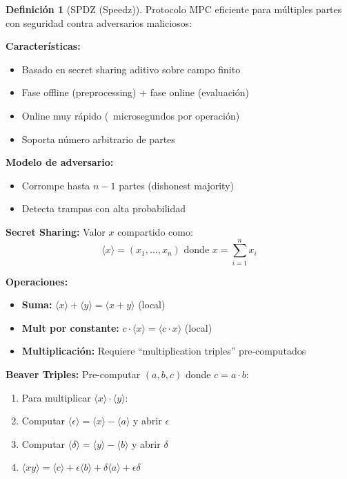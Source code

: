 \documentclass[11pt,a4paper,twoside]{book}
\theoremstyle{definition}
\newtheorem{definition}{Definición}[chapter]
\theoremstyle{remark}
\begin{document}
\begin{definition}[SPDZ (Speedz)]
Protocolo MPC eficiente para múltiples partes con seguridad contra adversarios maliciosos:

\textbf{Características:}
\begin{itemize}
    \item Basado en secret sharing aditivo sobre campo finito
    \item Fase offline (preprocessing) + fase online (evaluación)
    \item Online muy rápido (~microsegundos por operación)
    \item Soporta número arbitrario de partes
\end{itemize}

\textbf{Modelo de adversario:}
\begin{itemize}
    \item Corrompe hasta $n-1$ partes (dishonest majority)
    \item Detecta trampas con alta probabilidad
\end{itemize}
\end{definition}

\begin{mathnote}
\textbf{Secret Sharing:} Valor $x$ compartido como:
\[
\langle x \rangle = (x_1, ..., x_n) \text{ donde } x = \sum_{i=1}^n x_i
\]

\textbf{Operaciones:}
\begin{itemize}
    \item \textbf{Suma:} $\langle x \rangle + \langle y \rangle = \langle x + y \rangle$ (local)
    \item \textbf{Mult por constante:} $c \cdot \langle x \rangle = \langle c \cdot x \rangle$ (local)
    \item \textbf{Multiplicación:} Requiere ``multiplication triples'' pre-computados
\end{itemize}

\textbf{Beaver Triples:} Pre-computar $(a, b, c)$ donde $c = a \cdot b$:
\begin{enumerate}
    \item Para multiplicar $\langle x \rangle \cdot \langle y \rangle$:
    \item Computar $\langle \epsilon \rangle = \langle x \rangle - \langle a \rangle$ y abrir $\epsilon$
    \item Computar $\langle \delta \rangle = \langle y \rangle - \langle b \rangle$ y abrir $\delta$
    \item $\langle xy \rangle = \langle c \rangle + \epsilon \langle b \rangle + \delta \langle a \rangle + \epsilon \delta$
\end{enumerate}
\end{mathnote}
\end{document}
